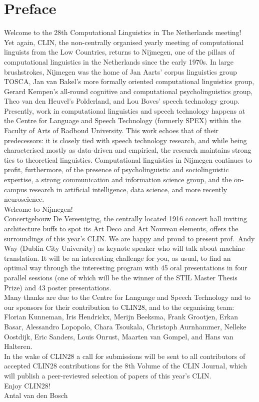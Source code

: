 \section*{Preface}



Welcome to the 28th Computational Linguistics in The Netherlands meeting!\\[1em]

Yet again, CLIN, the non-centrally organised yearly meeting of computational linguists from the Low Countries, returns to Nijmegen, one of the pillars of computational linguistics in the Netherlands since the early 1970s. In large brushstrokes, Nijmegen was the home of Jan Aarts’ corpus linguistics group TOSCA, Jan van Bakel’s more formally oriented computational linguistics group, Gerard Kempen’s all-round cognitive and computational psycholinguistics group, Theo van den Heuvel’s Polderland, and Lou Boves’ speech technology group. Presently, work in computational linguistics and speech technology happens at the Centre for Language and Speech Technology (formerly SPEX) within the Faculty of Arts of Radboud University. This work echoes that of their predecessors: it is closely tied with speech technology research, and while being characterised mostly as data-driven and empirical, the research maintains strong ties to theoretical linguistics. Computational linguistics in Nijmegen continues to profit, furthermore, of the presence of  psycholinguistic and sociolinguistic expertise, a strong communication and information science group, and the on-campus research in artificial intelligence, data science, and more recently neuroscience.\\[1em]

Welcome to Nijmegen!\\[1em]

Concertgebouw De Vereeniging, the centrally located 1916 concert hall inviting architecture buffs to spot its Art Deco and Art Nouveau elements, offers the surroundings of this year’s CLIN. We are happy and proud to present prof.~Andy Way (Dublin City University) as keynote speaker who will talk about machine translation. It will be an interesting challenge for you, as usual, to find an optimal way through the interesting program with 45 oral presentations in four parallel sessions (one of which will be the winner of the STIL Master Thesis Prize) and 43 poster presentations.\\[1em]

Many thanks are due to the Centre for Language and Speech Technology and to our sponsors for their contribution to CLIN28, and to the organising team: Florian Kunneman, Iris Hendrickx, Merijn Beeksma, Frank Grootjen, Erkan Basar, Alessandro Lopopolo, Chara Tsoukala, Christoph Aurnhammer, Nelleke Oostdijk, Eric Sanders, Louis Onrust, Maarten van Gompel, and Hans van Halteren.\\[1em]

In the wake of CLIN28 a call for submissions will be sent to all contributors of accepted CLIN28 contributions for the 8th Volume of the CLIN Journal, which will publish a peer-reviewed selection of papers of this year’s CLIN. \\[1em]

Enjoy CLIN28!\\[1em]

Antal van den Bosch


